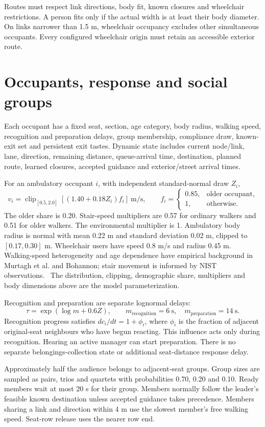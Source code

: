 \documentclass[11pt,a4paper]{article}
\newcommand{\clip}{\operatorname{clip}}
\begin{document}
Routes must respect link directions, body fit, known closures and wheelchair restrictions. A person fits only if the actual width is at least their body diameter. On links narrower than 1.5 m, wheelchair occupancy excludes other simultaneous occupants. Every configured wheelchair origin must retain an accessible exterior route.

\section{Occupants, response and social groups}
Each occupant has a fixed seat, section, age category, body radius, walking speed, recognition and preparation delays, group membership, compliance draw, known-exit set and persistent exit tastes. Dynamic state includes current node/link, lane, direction, remaining distance, queue-arrival time, destination, planned route, learned closures, accepted guidance and exterior/street arrival times.

For an ambulatory occupant $i$, with independent standard-normal draw $Z_i$,
\[
v_i=\clip_{[0.5,2.0]}\!\left[(1.40+0.18Z_i)f_i\right]\ \mathrm{m/s},
\qquad f_i=\begin{cases}0.85,&\text{older occupant},\\1,&\text{otherwise}.\end{cases}
\]
The older share is 0.20. Stair-speed multipliers are 0.57 for ordinary walkers and 0.51 for older walkers. The environmental multiplier is 1. Ambulatory body radius is normal with mean 0.22 m and standard deviation 0.02 m, clipped to $[0.17,0.30]$ m. Wheelchair users have speed 0.8 m/s and radius 0.45 m. Walking-speed heterogeneity and age dependence have empirical background in Murtagh et al. and Bohannon; stair movement is informed by NIST observations.~\cite{murtagh,bohannon,nist} The distribution, clipping, demographic share, multipliers and body dimensions above are the model parameterization.~\cite{model}

Recognition and preparation are separate lognormal delays:
\[
\tau=\exp(\log m+0.6Z),\qquad
m_{\mathrm{recognition}}=6\ \mathrm{s},\quad m_{\mathrm{preparation}}=14\ \mathrm{s}.
\]
Recognition progress satisfies $dc_i/dt=1+\phi_i$, where $\phi_i$ is the fraction of adjacent original-seat neighbours who have begun reacting. This influence acts only during recognition. Hearing an active manager can start preparation. There is no separate belongings-collection state or additional seat-distance response delay.

Approximately half the audience belongs to adjacent-seat groups. Group sizes are sampled as pairs, trios and quartets with probabilities 0.70, 0.20 and 0.10. Ready members wait at most 20 s for their group. Members normally follow the leader's feasible known destination unless accepted guidance takes precedence. Members sharing a link and direction within 4 m use the slowest member's free walking speed. Seat-row release uses the nearer row end.
\end{document}
